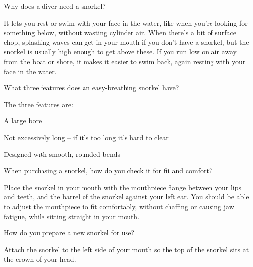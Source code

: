 	\begin{qanda}
		\begin{question}
Why does a diver need a snorkel?
		\end{question}

		\begin{answer}
It lets you rest or swim with your face in the water, like when you're looking for something below, without wasting cylinder air.  When there's a bit of surface chop, splashing waves can get in your mouth if you don't have a snorkel, but the snorkel is usually high enough to get above these.  If you run low on air away from the boat or shore, it makes it easier to swim back, again resting with your face in the water.
		\end{answer}
	\end{qanda}

	\begin{qanda}
		\begin{question}
What three features does an easy-breathing snorkel have?
		\end{question}

		\begin{answer}
The three features are:
			\begin{nospacenumberedlist}
				\item A large bore
				\item Not excessively long -- if it's too long it's hard to clear
				\item Designed with smooth, rounded bends
			\end{nospacenumberedlist}
		\end{answer}
	\end{qanda}

	\begin{qanda}
		\begin{question}
When purchasing a snorkel, how do you check it for fit and comfort?
		\end{question}

		\begin{answer}
Place the snorkel in your mouth with the mouthpiece flange between your lips and teeth, and the barrel of the snorkel against your left ear.  You should be able to adjust the mouthpiece to fit comfortably, without chaffing or causing jaw fatigue, while sitting straight in your mouth.
		\end{answer}
	\end{qanda}

	\begin{qanda}
		\begin{question}
How do you prepare a new snorkel for use?
		\end{question}

		\begin{answer}
Attach the snorkel to the left side of your mouth so the top of the snorkel sits at the crown of your head.
		\end{answer}
	\end{qanda}

